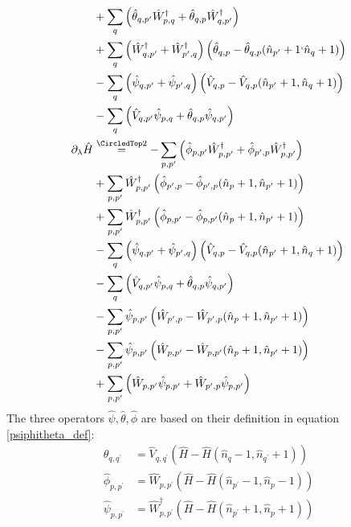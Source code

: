\begin{appendix}
\begin{subequations}
\begin{align}
&+     \Sum_{q}\left(\hat\theta_{ q, p^\prime}\hat W_{p,q}^\dagger+\hat\theta_{ q, p}\hat W_{q,p^\prime}^\dagger\right)                      \nonumber\\
&+      \Sum_{q}\left(\hat W_{q,p^\prime}^\dagger+\hat W_{p^\prime,q}^\dagger\right) \left(\hat\theta_{ q,p}-\hat\theta_{ q,p}(\hat n_{p^\prime}+1^,\hat n_{q}+1)\right)                     \nonumber\\
&-      \Sum_{q}\left(\hat \psi_{q,p^\prime}+\hat \psi_{p^\prime,q}\right) \left(\hat V_{ q,p}-\hat V_{ q,p}(\hat n_{p^\prime}+1,\hat n_{q}+1)\right)                     \nonumber\\
&-      \Sum_{q}\left(\hat V_{ q, p^\prime}\hat \psi_{p,q}+\hat\theta_{ q, p}\hat \psi_{q,p^\prime}\right)                     \nonumber\\
\partial_\lambda\hat H&\eqsec -\Sum_{p, p^\prime}\left( \hat\phi_{ p, p^\prime}\hat W_{p,p^\prime}^\dagger+ \hat\phi_{p^\prime,p}\hat W_{p,p^\prime}^\dagger\right) \label{feq_ndep_IV}\\
&+\Sum_{p, p^\prime}\hat W_{p,p^\prime}^\dagger \left(\hat\phi_{p^\prime,p}-\hat\phi_{p^\prime,p}(\hat n_p+1,\hat n_{p^\prime}+1)\right) \nonumber\\
&+\Sum_{p, p^\prime}\hat W_{p,p^\prime}^\dagger \left(\hat\phi_{ p, p^\prime}-\hat\phi_{ p, p^\prime}(\hat n_p+1,\hat n_{p^\prime}+1)\right)\nonumber\\
&-\Sum_{q}\left(\hat \psi_{q,p^\prime}+\hat \psi_{p^\prime,q}\right) \left(\hat V_{ q,p}-\hat V_{ q,p}(\hat n_{p^\prime}+1,\hat n_{q}+1)\right)                           \nonumber\\
&-\Sum_{q}\left(\hat V_{ q, p^\prime}\hat \psi_{p,q}+\hat\theta_{ q, p}\hat \psi_{q,p^\prime}\right)                           \nonumber\\
&-\Sum_{p, p^\prime}\hat \psi_{p,p^\prime} \left(\hat W_{p^\prime,p}-\hat W_{p^\prime,p}(\hat n_p+1,\hat n_{p^\prime}+1)\right) \nonumber\\
&-\Sum_{p, p^\prime}\hat \psi_{p,p^\prime} \left(\hat W_{ p, p^\prime}-\hat W_{ p, p^\prime}(\hat n_p+1,\hat n_{p^\prime}+1)\right)\nonumber\\
&+\Sum_{p, p^\prime}\left( \hat W_{ p, p^\prime}\hat \psi_{p,p^\prime}+ \hat W_{p^\prime,p}\hat \psi_{p,p^\prime}\right)\nonumber
\end{align}
\end{subequations}
The three operators $\hat\psi,\hat\theta,\hat\phi$ are based on their definition in equation \ref{psiphitheta_def}:
\begin{align}
\hat\theta_{q,q^\prime}&=\hat V_{q,q^\prime} \left(\hat H - \hat H(\hat n_q-1,\hat n_{q^\prime}+1)\right)\\
\hat\phi_{p,p^\prime}&=\hat W_{p,p^\prime}\left(\hat H-\hat H(\hat n_{p^\prime}-1,\hat n_p -1)\right)\\
\hat\psi_{p,p^\prime}&=\hat W_{p,p^\prime}^\dagger\left(\hat H-\hat H(\hat n_{p^\prime}+1,\hat n_p +1)\right)
\end{align}

\end{appendix}
